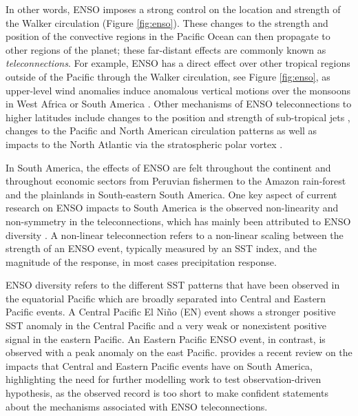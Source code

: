 In other words, ENSO imposes a strong control on the location and strength of the Walker circulation (Figure \ref{fig:enso}). These changes to the strength and position of the convective regions in the Pacific Ocean can then propagate to other regions of the planet; these far-distant effects are commonly known as \textit{teleconnections}.  
For example, ENSO has a direct effect over other tropical regions outside of the Pacific through the Walker circulation, see Figure \ref{fig:enso}, as upper-level wind anomalies induce anomalous vertical motions over the monsoons in West Africa \citep{ropelewski1986,ropelewski1987} or South America \citep{sulca2018}.  
  Other mechanisms of ENSO teleconnections to higher latitudes include changes to the position and strength of sub-tropical jets \citep{fereday2020}, changes to the Pacific and North American circulation patterns \citep{bayr2019} as well as impacts to the North Atlantic via the stratospheric polar vortex \citep{domeisen2019}.
  
  In South America, the effects of ENSO are felt throughout the continent and throughout economic sectors from Peruvian fishermen \citep{takahashi2004} to the Amazon rain-forest and the plainlands in South-eastern South America\citep{grimm2011,marengo2012}. 
  One key aspect of current research on ENSO impacts to South America is the observed non-linearity and non-symmetry in the teleconnections, which has mainly been attributed to ENSO diversity \citep{tedeschi2015,cai2020}.
A non-linear teleconnection refers to a non-linear scaling between the strength of an ENSO event, typically measured by an SST index, and the magnitude of the response, in most cases precipitation response. %

ENSO diversity refers to the different SST patterns that have been observed in the equatorial Pacific which are broadly separated into Central and Eastern Pacific events. 
A Central Pacific El Niño (EN) event shows a stronger positive SST anomaly in the Central Pacific and a very weak or nonexistent positive signal in the eastern Pacific. 
An Eastern Pacific ENSO event, in contrast, is observed with a peak anomaly on the east Pacific. 
\cite{cai2020} provides a recent review on the impacts that Central and Eastern Pacific events have on South America, highlighting the need for further modelling work to test observation-driven hypothesis, as the observed record is too short to make confident statements about the mechanisms associated with ENSO teleconnections.

